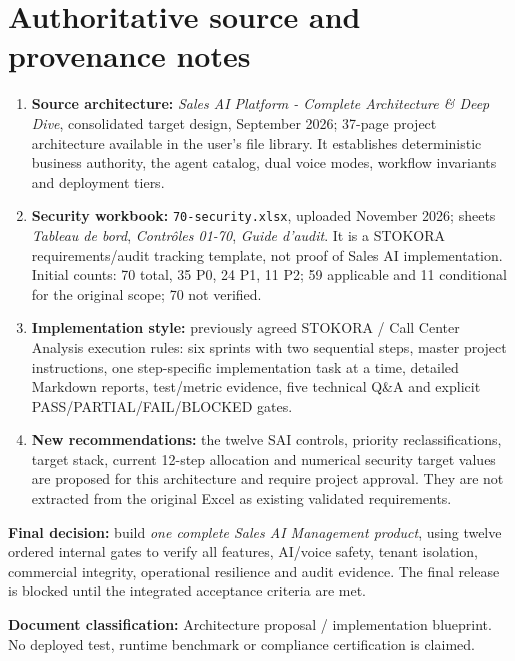 \documentclass[10.5pt,a4paper,oneside]{article}
\begin{document}
\section{Authoritative source and provenance notes}
\begin{enumerate}
\item \textbf{Source architecture:} \emph{Sales AI Platform - Complete Architecture \& Deep Dive}, consolidated target design, September 2026; 37-page project architecture available in the user's file library. It establishes deterministic business authority, the agent catalog, dual voice modes, workflow invariants and deployment tiers.
\item \textbf{Security workbook:} \texttt{70-security.xlsx}, uploaded November 2026; sheets \emph{Tableau de bord}, \emph{Contr\^oles 01-70}, \emph{Guide d'audit}. It is a STOKORA requirements/audit tracking template, not proof of Sales AI implementation. Initial counts: 70 total, 35 P0, 24 P1, 11 P2; 59 applicable and 11 conditional for the original scope; 70 not verified.
\item \textbf{Implementation style:} previously agreed STOKORA / Call Center Analysis execution rules: six sprints with two sequential steps, master project instructions, one step-specific implementation task at a time, detailed Markdown reports, test/metric evidence, five technical Q\&A and explicit PASS/PARTIAL/FAIL/BLOCKED gates.
\item \textbf{New recommendations:} the twelve SAI controls, priority reclassifications, target stack, current 12-step allocation and numerical security target values are proposed for this architecture and require project approval. They are not extracted from the original Excel as existing validated requirements.
\end{enumerate}
\begin{keybox}
\textbf{Final decision:} build \emph{one complete Sales AI Management product}, using twelve ordered internal gates to verify all features, AI/voice safety, tenant isolation, commercial integrity, operational resilience and audit evidence. The final release is blocked until the integrated acceptance criteria are met.
\end{keybox}
\vfill
{\small\sffamily\color{graytext}\textbf{Document classification:} Architecture proposal / implementation blueprint. No deployed test, runtime benchmark or compliance certification is claimed.}
\end{document}
